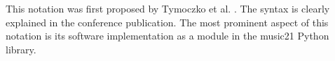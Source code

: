 This notation was first proposed by Tymoczko et al.
\parencite{tymoczko}. The syntax is clearly explained in the
conference publication. The most prominent aspect of this
notation is its software implementation as a module in the
music21 Python library.
